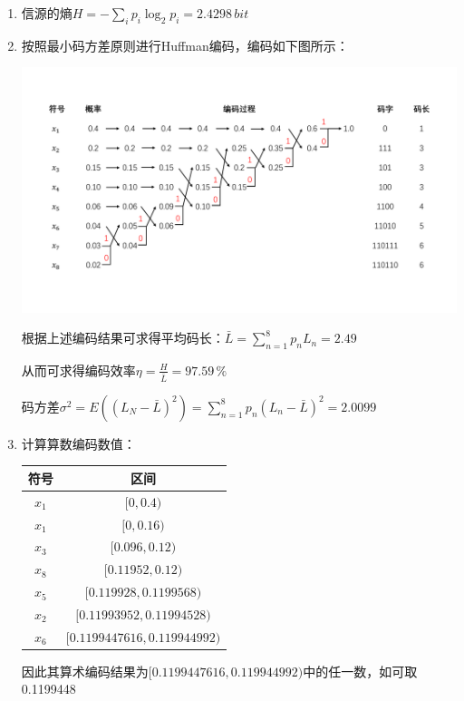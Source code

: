 \documentclass[]{article}
\begin{document}
\begin{enumerate}[(1)]
    \item 
        信源的熵$H=-\sum_i p_i\log_2p_i=2.4298\,bit$
        
    \item
        按照最小码方差原则进行Huffman编码，编码如下图所示：
        
        \centerline{\includegraphics[width=\linewidth]{figures/encode.pdf}}
        
        根据上述编码结果可求得平均码长：$\bar{L}=\sum_{n=1}^8 p_n L_n=2.49$
        
        从而可求得编码效率$\eta=\frac{H}{\bar{L}}=97.59\,\%$
        
        码方差$\sigma^2=E((L_N-\bar{L})^2)=\sum_{n=1}^8 p_n (L_n-\bar{L})^2=2.0099$
    \item
    计算算数编码数值：
    
        \begin{table}[h]
            \centering
            \begin{tabular}{|c|c|}
                \hline
                符号 & 区间 \\
                \hline
                $x_1$ & $[0,0.4)$ \\
                \hline
                $x_1$ & $[0,0.16)$ \\
                \hline
                $x_3$ & $[0.096,0.12)$ \\
                \hline
                $x_8$ & $[0.11952,0.12)$ \\
                \hline
                $x_5$ & $[0.119928,0.1199568)$ \\
                \hline
                $x_2$ & $[0.11993952,0.11994528)$ \\
                \hline
                $x_6$ & $[0.1199447616,0.119944992)$ \\
                \hline
            \end{tabular}
        \end{table}
    
    因此其算术编码结果为$[0.1199447616,0.119944992)$中的任一数，如可取0.1199448
\end{enumerate}
\end{document}
